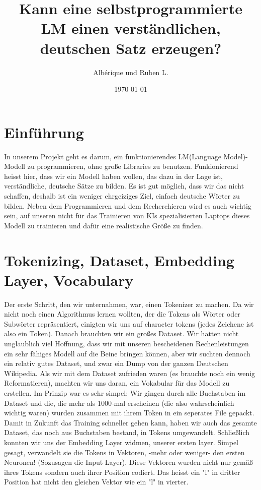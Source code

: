 \documentclass[12pt, letterpaper]{article}
\title{Kann eine selbstprogrammierte LM einen verständlichen, deutschen Satz erzeugen?}
\author{Albérique und Ruben L.}
\date{\today}
\begin{document}
\maketitle
\newpage
\section{Einführung}

In unserem Projekt geht es darum, ein funktionierendes LM(Language Model)-Modell zu programmieren, ohne große Libraries zu benutzen. Funkionierend heisst hier, dass wir ein Modell haben wollen, das dazu in der Lage ist, verständliche, deutsche Sätze zu bilden. Es ist gut möglich, dass wir das nicht schaffen, deshalb ist ein weniger ehrgeiziges Ziel, einfach deutsche Wörter zu bilden. Neben dem Programmieren und dem Recherchieren wird es auch wichtig sein, auf unseren nicht für das Trainieren von KIs spezialisierten Laptops dieses Modell zu trainieren und dafür eine realistische Größe zu finden.
\section{Tokenizing, Dataset, Embedding Layer, Vocabulary}
Der erste Schritt, den wir unternahmen, war, einen Tokenizer zu machen. Da wir nicht noch einen Algorithmus lernen wollten, der die Tokens als Wörter oder Subwörter repräsentiert, einigten wir uns auf character tokens (jedes Zeichene ist also ein Token).
Danach brauchten wir ein großes Dataset. Wir hatten nicht unglaublich viel Hoffnung, dass wir mit unseren bescheidenen Rechenleistungen ein sehr fähiges Modell auf die Beine bringen können, aber wir suchten dennoch ein relativ gutes Dataset, und zwar ein Dump von der ganzen Deutschen Wikipedia.
Als wir mit dem Dataset zufrieden waren (es brauchte noch ein wenig Reformatieren), machten wir uns daran, ein Vokabular für das Modell zu erstellen. Im Prinzip war es sehr simpel: Wir gingen durch alle Buchstaben im Dataset und die, die mehr als 1000-mal erscheinen (die also wahrscheinlich wichtig waren) wurden zusammen mit ihrem Token in ein seperates File gepackt.
Damit in Zukunft das Training schneller gehen kann, haben wir auch das gesamte Dataset, das noch aus Buchstaben bestand, in Tokens umgewandelt. 
Schließlich konnten wir uns der Embedding Layer widmen, unserer ersten layer. Simpel gesagt, verwandelt sie die Tokens in Vektoren, -mehr oder weniger- den ersten Neuronen! (Sozusagen die Input Layer). Diese Vektoren wurden nicht nur gemäß ihres Tokens sondern auch ihrer Position codiert. Das heisst ein "l" in dritter Position hat nicht den gleichen Vektor wie ein "l" in vierter. 
\end{document}
